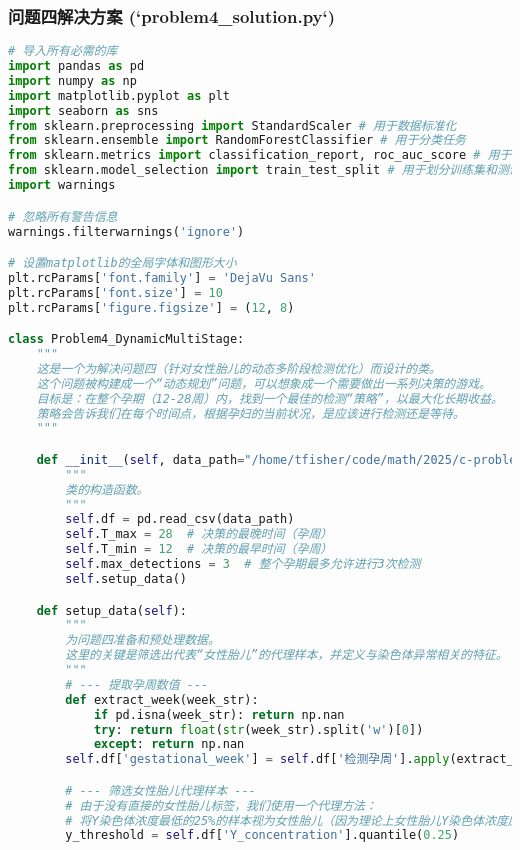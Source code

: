 \documentclass[UTF8, a4paper, 11pt]{ctexart}
\begin{document}
\subsubsection{问题四解决方案 (`problem4_solution.py`)}
\begin{lstlisting}[language=Python, caption={问题四的解决方案脚本。}]
# 导入所有必需的库
import pandas as pd
import numpy as np
import matplotlib.pyplot as plt
import seaborn as sns
from sklearn.preprocessing import StandardScaler # 用于数据标准化
from sklearn.ensemble import RandomForestClassifier # 用于分类任务
from sklearn.metrics import classification_report, roc_auc_score # 用于评估分类模型
from sklearn.model_selection import train_test_split # 用于划分训练集和测试集
import warnings

# 忽略所有警告信息
warnings.filterwarnings('ignore')

# 设置matplotlib的全局字体和图形大小
plt.rcParams['font.family'] = 'DejaVu Sans'
plt.rcParams['font.size'] = 10
plt.rcParams['figure.figsize'] = (12, 8)

class Problem4_DynamicMultiStage:
    """
    这是一个为解决问题四（针对女性胎儿的动态多阶段检测优化）而设计的类。
    这个问题被构建成一个“动态规划”问题，可以想象成一个需要做出一系列决策的游戏。
    目标是：在整个孕期（12-28周）内，找到一个最佳的检测“策略”，以最大化长期收益。
    策略会告诉我们在每个时间点，根据孕妇的当前状况，是应该进行检测还是等待。
    """

    def __init__(self, data_path="/home/tfisher/code/math/2025/c-problem/new-plan/processed_data.csv"):
        """
        类的构造函数。
        """
        self.df = pd.read_csv(data_path)
        self.T_max = 28  # 决策的最晚时间（孕周）
        self.T_min = 12  # 决策的最早时间（孕周）
        self.max_detections = 3  # 整个孕期最多允许进行3次检测
        self.setup_data()

    def setup_data(self):
        """
        为问题四准备和预处理数据。
        这里的关键是筛选出代表“女性胎儿”的代理样本，并定义与染色体异常相关的特征。
        """
        # --- 提取孕周数值 ---
        def extract_week(week_str):
            if pd.isna(week_str): return np.nan
            try: return float(str(week_str).split('w')[0])
            except: return np.nan
        self.df['gestational_week'] = self.df['检测孕周'].apply(extract_week)

        # --- 筛选女性胎儿代理样本 ---
        # 由于没有直接的女性胎儿标签，我们使用一个代理方法：
        # 将Y染色体浓度最低的25%的样本视为女性胎儿（因为理论上女性胎儿Y染色体浓度应为0）。
        y_threshold = self.df['Y_concentration'].quantile(0.25)


\end{lstlisting}
\end{document}
